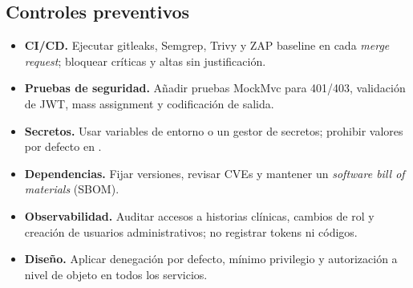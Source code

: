 \subsection{Controles preventivos}

\begin{itemize}
  \item \textbf{CI/CD.} Ejecutar gitleaks, Semgrep, Trivy y ZAP baseline en cada
  \textit{merge request}; bloquear críticas y altas sin justificación.
  \item \textbf{Pruebas de seguridad.} Añadir pruebas MockMvc para 401/403,
  validación de JWT, mass assignment y codificación de salida.
  \item \textbf{Secretos.} Usar variables de entorno o un gestor de secretos;
  prohibir valores por defecto en .
  \item \textbf{Dependencias.} Fijar versiones, revisar CVEs y mantener un
  \textit{software bill of materials} (SBOM).
  \item \textbf{Observabilidad.} Auditar accesos a historias clínicas, cambios de
  rol y creación de usuarios administrativos; no registrar tokens ni códigos.
  \item \textbf{Diseño.} Aplicar denegación por defecto, mínimo privilegio y
  autorización a nivel de objeto en todos los servicios.
\end{itemize}

